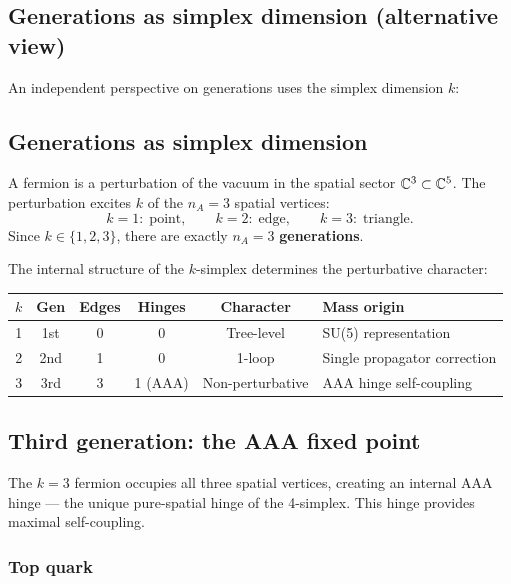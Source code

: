 \subsection{Generations as simplex dimension (alternative view)}
\label{sec:gen_alt}

An independent perspective on generations uses the simplex dimension $k$:

\subsection{Generations as simplex dimension}

A fermion is a perturbation of the vacuum in the spatial sector $\mathbb{C}^3 \subset \mathbb{C}^5$. The perturbation excites $k$ of the $n_A = 3$ spatial vertices:
\begin{equation}
k = 1:\;\text{point}, \qquad k = 2:\;\text{edge}, \qquad k = 3:\;\text{triangle}.
\end{equation}
Since $k \in \{1, 2, 3\}$, there are exactly $n_A = 3$ \textbf{generations}.

The internal structure of the $k$-simplex determines the perturbative character:

\begin{center}
\begin{tabular}{cccccl}
\hline
$k$ & Gen & Edges & Hinges & Character & Mass origin \\
\hline
1 & 1st & 0 & 0 & Tree-level & SU(5) representation \\
2 & 2nd & 1 & 0 & 1-loop & Single propagator correction \\
3 & 3rd & 3 & 1 (AAA) & Non-perturbative & AAA hinge self-coupling \\
\hline
\end{tabular}
\end{center}

\subsection{Third generation: the AAA fixed point}

The $k = 3$ fermion occupies all three spatial vertices, creating an internal AAA hinge --- the unique pure-spatial hinge of the 4-simplex. This hinge provides maximal self-coupling.

\subsubsection{Top quark}

